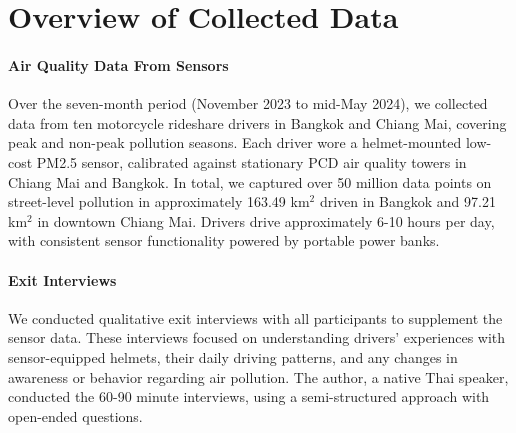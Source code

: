 \section{Overview of Collected Data}
\label{sec:result-overview-data}

\paragraph{Air Quality Data From Sensors}
Over the seven-month period (November 2023 to mid-May 2024), we collected data from ten motorcycle rideshare drivers in Bangkok and Chiang Mai, covering peak and non-peak pollution seasons.
Each driver wore a helmet-mounted low-cost PM2.5 sensor, calibrated against stationary PCD air quality towers in Chiang Mai and Bangkok.
In total, we captured over 50 million data points on street-level pollution in approximately 163.49 km$^2$ driven in Bangkok and 97.21 km$^2$ in downtown Chiang Mai.
Drivers drive approximately 6-10 hours per day, with consistent sensor functionality powered by portable power banks.




\paragraph{Exit Interviews}
We conducted qualitative exit interviews with all participants to supplement the sensor data. 
These interviews focused on understanding drivers' experiences with sensor-equipped helmets, their daily driving patterns, and any changes in awareness or behavior regarding air pollution. 
The author, a native Thai speaker, conducted the 60-90 minute interviews, using a semi-structured approach with open-ended questions. 

